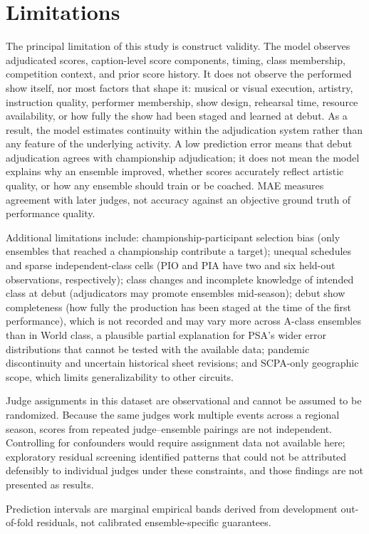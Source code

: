 \section{Limitations}
\label{sec:limitations}

The principal limitation of this study is construct validity. The model
observes adjudicated scores, caption-level score components, timing, class
membership, competition context, and prior score history. It does not observe
the performed show itself, nor most factors that shape it: musical or visual
execution, artistry, instruction quality, performer membership, show design,
rehearsal time, resource availability, or how fully the show had been
staged and learned at debut. As a result, the model estimates continuity within the
adjudication system rather than any feature of the underlying activity. A low
prediction error means that debut adjudication agrees with championship
adjudication; it does not mean the model explains why an ensemble improved,
whether scores accurately reflect artistic quality, or how any ensemble should
train or be coached. MAE measures agreement with later judges, not accuracy
against an objective ground truth of performance quality.

Additional limitations include: championship-participant selection bias (only
ensembles that reached a championship contribute a target); unequal schedules
and sparse independent-class cells (PIO and PIA have two and six held-out
observations, respectively); class changes and incomplete knowledge of
intended class at debut (adjudicators may promote ensembles mid-season);
debut show completeness (how fully the production has been staged at the time
of the first performance), which is not recorded and may vary more across
A-class ensembles than in World class, a plausible partial explanation for
PSA's wider error distributions that cannot be tested with the available data;
pandemic discontinuity and uncertain historical sheet revisions; and
SCPA-only geographic scope, which limits generalizability to other circuits.

Judge assignments in this dataset are observational and cannot be assumed to
be randomized. Because the same judges work multiple events across a regional season, scores from repeated judge--ensemble pairings are not
independent. Controlling for confounders would require assignment data not
available here; exploratory residual screening identified patterns that could
not be attributed defensibly to individual judges under these constraints, and
those findings are not presented as results.

Prediction intervals are marginal empirical bands derived from development
out-of-fold residuals, not calibrated ensemble-specific guarantees.
